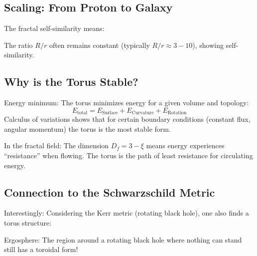 \subsection{Scaling: From Proton to Galaxy}
The fractal self-similarity means:
\begin{table}[H]
	\centering
\end{table}
The ratio \( R/r \) often remains constant (typically \( R/r \approx 3-10 \)), showing self-similarity.

\subsection{Why is the Torus Stable?}
Energy minimum:
The torus minimizes energy for a given volume and topology:
\[
E_{\text{total}} = E_{\text{Surface}} + E_{\text{Curvature}} + E_{\text{Rotation}}
\]
Calculus of variations shows that for certain boundary conditions (constant flux, angular momentum) the torus is the most stable form.

In the fractal field:
The dimension \( D_f = 3 - \xi \) means energy experiences ``resistance'' when flowing. The torus is the path of least resistance for circulating energy.

\subsection{Connection to the Schwarzschild Metric}
Interestingly: Considering the Kerr metric (rotating black hole), one also finds a torus structure:

Ergosphere: The region around a rotating black hole where nothing can stand still has a toroidal form!

